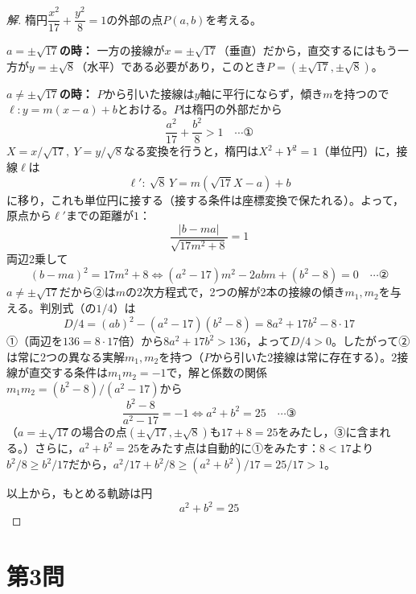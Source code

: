 \documentclass[../main.tex]{subfiles}
\begin{document}
\begin{proof}[解]
  楕円$\dfrac{x^2}{17}+\dfrac{y^2}8=1$の外部の点$P(a,b)$を考える。

  \textbf{$a=\pm\sqrt{17}$の時：} 一方の接線が$x=\pm\sqrt{17}$（垂直）だから，直交するにはもう一方が$y=\pm\sqrt8$（水平）である必要があり，このとき$P=(\pm\sqrt{17},\pm\sqrt8)$。

  \textbf{$a\ne\pm\sqrt{17}$の時：} $P$から引いた接線は$y$軸に平行にならず，傾き$m$を持つので$\ell:y=m(x-a)+b$とおける。$P$は楕円の外部だから
  \[
    \frac{a^2}{17}+\frac{b^2}8>1 \quad\cdots\text{①}
  \]
  $X=x/\sqrt{17},\ Y=y/\sqrt8$なる変換を行うと，楕円は$X^2+Y^2=1$（単位円）に，接線$\ell$は
  \[
    \ell':\ \sqrt8\,Y=m(\sqrt{17}X-a)+b
  \]
  に移り，これも単位円に接する（接する条件は座標変換で保たれる）。よって，原点から$\ell'$までの距離が$1$：
  \[
    \frac{|b-ma|}{\sqrt{17m^2+8}}=1
  \]
  両辺2乗して
  \[
    (b-ma)^2=17m^2+8 \iff (a^2-17)m^2-2abm+(b^2-8)=0 \quad\cdots\text{②}
  \]
  $a\ne\pm\sqrt{17}$だから②は$m$の2次方程式で，2つの解が2本の接線の傾き$m_1,m_2$を与える。判別式（の$1/4$）は
  \[
    D/4=(ab)^2-(a^2-17)(b^2-8)=8a^2+17b^2-8\cdot17
  \]
  ①（両辺を$136=8\cdot17$倍）から$8a^2+17b^2>136$，よって$D/4>0$。したがって②は常に2つの異なる実解$m_1,m_2$を持つ（$P$から引いた2接線は常に存在する）。2接線が直交する条件は$m_1m_2=-1$で，解と係数の関係$m_1m_2=(b^2-8)/(a^2-17)$から
  \[
    \frac{b^2-8}{a^2-17}=-1 \iff a^2+b^2=25 \quad\cdots\text{③}
  \]
  （$a=\pm\sqrt{17}$の場合の点$(\pm\sqrt{17},\pm\sqrt8)$も$17+8=25$をみたし，③に含まれる。）さらに，$a^2+b^2=25$をみたす点は自動的に①をみたす：$8<17$より$b^2/8\ge b^2/17$だから，$a^2/17+b^2/8\ge(a^2+b^2)/17=25/17>1$。

  以上から，もとめる軌跡は円
  \[
    a^2+b^2=25
  \]
\end{proof}

\newpage

\section*{第3問}
\end{document}
